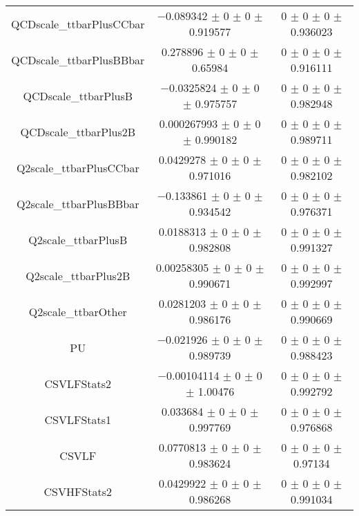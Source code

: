 \begin{table}
\begin{tabular}{ccc}
QCDscale\_ttbarPlusCCbar 	& \num{-0.089342} $\pm$ \num{0} $\pm$ \num{0} $\pm$ \num{0.919577} 	& \num{0} $\pm$ \num{0} $\pm$ \num{0} $\pm$ \num{0.936023}\\
QCDscale\_ttbarPlusBBbar 	& \num{0.278896} $\pm$ \num{0} $\pm$ \num{0} $\pm$ \num{0.65984} 	& \num{0} $\pm$ \num{0} $\pm$ \num{0} $\pm$ \num{0.916111}\\
QCDscale\_ttbarPlusB 	& \num{-0.0325824} $\pm$ \num{0} $\pm$ \num{0} $\pm$ \num{0.975757} 	& \num{0} $\pm$ \num{0} $\pm$ \num{0} $\pm$ \num{0.982948}\\
QCDscale\_ttbarPlus2B 	& \num{0.000267993} $\pm$ \num{0} $\pm$ \num{0} $\pm$ \num{0.990182} 	& \num{0} $\pm$ \num{0} $\pm$ \num{0} $\pm$ \num{0.989711}\\
Q2scale\_ttbarPlusCCbar 	& \num{0.0429278} $\pm$ \num{0} $\pm$ \num{0} $\pm$ \num{0.971016} 	& \num{0} $\pm$ \num{0} $\pm$ \num{0} $\pm$ \num{0.982102}\\
Q2scale\_ttbarPlusBBbar 	& \num{-0.133861} $\pm$ \num{0} $\pm$ \num{0} $\pm$ \num{0.934542} 	& \num{0} $\pm$ \num{0} $\pm$ \num{0} $\pm$ \num{0.976371}\\
Q2scale\_ttbarPlusB 	& \num{0.0188313} $\pm$ \num{0} $\pm$ \num{0} $\pm$ \num{0.982808} 	& \num{0} $\pm$ \num{0} $\pm$ \num{0} $\pm$ \num{0.991327}\\
Q2scale\_ttbarPlus2B 	& \num{0.00258305} $\pm$ \num{0} $\pm$ \num{0} $\pm$ \num{0.990671} 	& \num{0} $\pm$ \num{0} $\pm$ \num{0} $\pm$ \num{0.992997}\\
Q2scale\_ttbarOther 	& \num{0.0281203} $\pm$ \num{0} $\pm$ \num{0} $\pm$ \num{0.986176} 	& \num{0} $\pm$ \num{0} $\pm$ \num{0} $\pm$ \num{0.990669}\\
PU 	& \num{-0.021926} $\pm$ \num{0} $\pm$ \num{0} $\pm$ \num{0.989739} 	& \num{0} $\pm$ \num{0} $\pm$ \num{0} $\pm$ \num{0.988423}\\
CSVLFStats2 	& \num{-0.00104114} $\pm$ \num{0} $\pm$ \num{0} $\pm$ \num{1.00476} 	& \num{0} $\pm$ \num{0} $\pm$ \num{0} $\pm$ \num{0.992792}\\
CSVLFStats1 	& \num{0.033684} $\pm$ \num{0} $\pm$ \num{0} $\pm$ \num{0.997769} 	& \num{0} $\pm$ \num{0} $\pm$ \num{0} $\pm$ \num{0.976868}\\
CSVLF 	& \num{0.0770813} $\pm$ \num{0} $\pm$ \num{0} $\pm$ \num{0.983624} 	& \num{0} $\pm$ \num{0} $\pm$ \num{0} $\pm$ \num{0.97134}\\
CSVHFStats2 	& \num{0.0429922} $\pm$ \num{0} $\pm$ \num{0} $\pm$ \num{0.986268} 	& \num{0} $\pm$ \num{0} $\pm$ \num{0} $\pm$ \num{0.991034}\\

\end{tabular}
\end{table}
